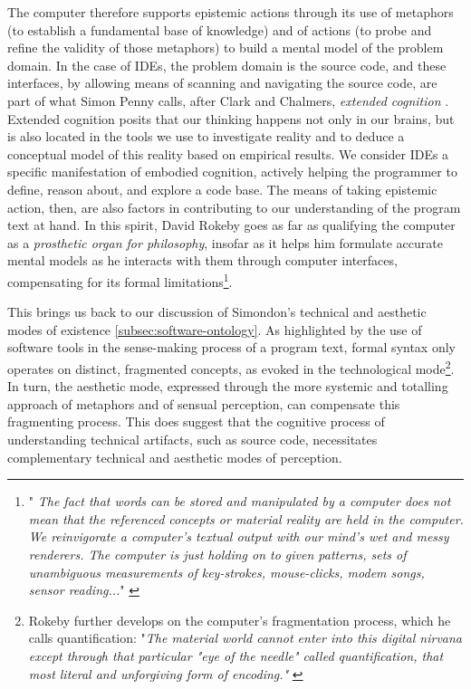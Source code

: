 The computer therefore supports epistemic actions through its use of metaphors (to establish a fundamental base of knowledge) and of actions (to probe and refine the validity of those metaphors) to build a mental model of the problem domain. In the case of IDEs, the problem domain is the source code, and these interfaces, by allowing means of scanning and navigating the source code, are part of what Simon Penny calls, after Clark and Chalmers, \emph{extended cognition} \citep{penny_making_2019}. Extended cognition posits that our thinking happens not only in our brains, but is also located in the tools we use to investigate reality and to deduce a conceptual model of this reality based on empirical results. We consider IDEs a specific manifestation of embodied cognition, actively helping the programmer to define, reason about, and explore a code base. The means of taking epistemic action, then, are also factors in contributing to our understanding of the program text at hand. In this spirit, David Rokeby goes as far as qualifying the computer as a \emph{prosthetic organ for philosophy}, insofar as it helps him formulate accurate mental models as he interacts with them through computer interfaces, compensating for its formal limitations\footnote{"\emph{ The fact that words can be stored and manipulated by a computer does not mean that the referenced concepts or material reality are held in the computer. We reinvigorate a computer's textual output with our mind's wet and messy renderers. The computer is just holding on to given patterns, sets of unambiguous measurements of key-strokes, mouse-clicks, modem songs, sensor reading...}" \citep{rokeby_computer_2003}}.

This brings us back to our discussion of Simondon's technical and aesthetic modes of existence \autoref{subsec:software-ontology}. As highlighted by the use of software tools in the sense-making process of a program text, formal syntax only operates on distinct, fragmented concepts, as evoked in the technological mode\footnote{Rokeby further develops on the computer's fragmentation process, which he calls quantification: "\emph{The material world cannot enter into this digital nirvana except through that particular "eye of the needle" called quantification, that most literal and unforgiving form of encoding."} \citep{rokeby_computer_2003}}. In turn, the aesthetic mode, expressed through the more systemic and totalling approach of metaphors and of sensual perception, can compensate this fragmenting process. This does suggest that the cognitive process of understanding technical artifacts, such as source code, necessitates complementary technical and aesthetic modes of perception.

